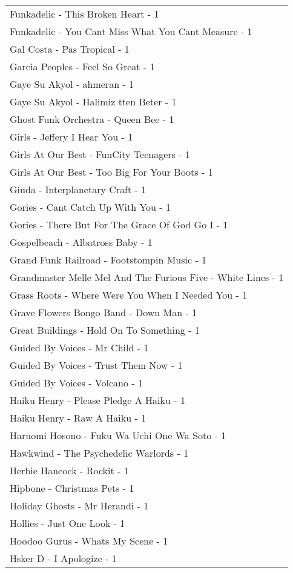 \documentclass[
]{article}
\begin{document}
\begin{longtable}{l}
Funkadelic - This Broken Heart - 1 \\ 
Funkadelic - You Cant Miss What You Cant Measure - 1 \\ 
Gal Costa - Pas Tropical - 1 \\ 
Garcia Peoples - Feel So Great - 1 \\ 
Gaye Su Akyol - ahmeran - 1 \\ 
Gaye Su Akyol - Halimiz tten Beter - 1 \\ 
Ghost Funk Orchestra - Queen Bee - 1 \\ 
Girls - Jeffery I Hear You - 1 \\ 
Girls At Our Best - FunCity Teenagers - 1 \\ 
Girls At Our Best - Too Big For Your Boots - 1 \\ 
Giuda - Interplanetary Craft - 1 \\ 
Gories - Cant Catch Up With You - 1 \\ 
Gories - There But For The Grace Of God Go I - 1 \\ 
Gospelbeach - Albatross Baby - 1 \\ 
Grand Funk Railroad - Footstompin Music - 1 \\ 
Grandmaster Melle Mel And The Furious Five - White Lines - 1 \\ 
Grass Roots - Where Were You When I Needed You - 1 \\ 
Grave Flowers Bongo Band - Down Man - 1 \\ 
Great Buildings - Hold On To Something - 1 \\ 
Guided By Voices - Mr Child - 1 \\ 
Guided By Voices - Trust Them Now - 1 \\ 
Guided By Voices - Volcano - 1 \\ 
Haiku Henry - Please Pledge A Haiku - 1 \\ 
Haiku Henry - Raw A Haiku - 1 \\ 
Haruomi Hosono - Fuku Wa Uchi One Wa Soto - 1 \\ 
Hawkwind - The Psychedelic Warlords - 1 \\ 
Herbie Hancock - Rockit - 1 \\ 
Hipbone - Christmas Pets - 1 \\ 
Holiday Ghosts - Mr Herandi - 1 \\ 
Hollies - Just One Look - 1 \\ 
Hoodoo Gurus - Whats My Scene - 1 \\ 
Hsker D - I Apologize - 1 \\ 

\end{longtable}
\end{document}

